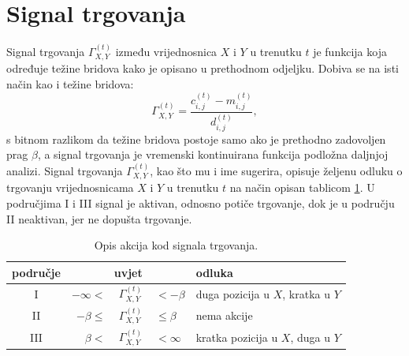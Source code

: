 \documentclass[lmodern, utf8, diplomski, numeric]{fer}
\newcommand{\q}{\left}
\newcommand{\w}{\right}
\begin{document}
  \section{Signal trgovanja}
  Signal trgovanja $\Gamma_{X, Y}^{(t)}$ između vrijednosnica $X$ i $Y$ u trenutku $t$ je funkcija koja određuje težine bridova kako je opisano u prethodnom odjeljku.
  Dobiva se na isti način kao i težine bridova:
  \begin{equation}
    \Gamma_{X, Y}^{(t)} = \frac{c_{i,j}^{\q(t\w)} - m_{i,j}^{\q(t\w)}}{d_{i,j}^{\q(t\w)}},
  \end{equation}
  s bitnom razlikom da težine bridova postoje samo ako je prethodno zadovoljen prag $\beta$, a signal trgovanja je vremenski kontinuirana funkcija podložna daljnjoj analizi.
  Signal trgovanja $\Gamma_{X, Y}^{(t)}$, kao što mu i ime sugerira, opisuje željenu odluku o trgovanju vrijednosnicama $X$ i $Y$ u trenutku $t$ na način opisan tablicom \ref{table:trading-signal}.
  U područjima I i III signal je aktivan, odnosno potiče trgovanje, dok je u području II neaktivan, jer ne dopušta trgovanje.
  \begin{table}[h]
    \centering
    \caption{Opis akcija kod signala trgovanja.}
    \label{table:trading-signal}
    \begin{tabular}{cr@{}c@{}ll}
      \toprule
      područje & \multicolumn{3}{c}{uvjet} & odluka \\
      \midrule
      I & $-\infty <$ & $\,\Gamma_{X, Y}^{(t)}\,$ & $< -\beta$ & duga pozicija u $X$, kratka u $Y$ \\
      II & $-\beta \le$ & $\,\Gamma_{X, Y}^{(t)}\,$ & $\le \beta $ & nema akcije \\
      III & $\beta <$ & $\,\Gamma_{X, Y}^{(t)}\,$ & $< \infty$ & kratka pozicija u $X$, duga u $Y$ \\
      \bottomrule
    \end{tabular}
  \end{table}
\end{document}
